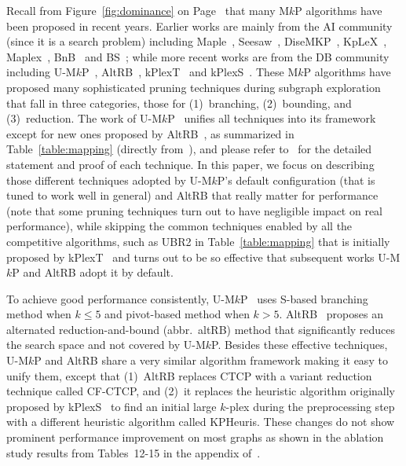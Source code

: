 \documentclass[sigconf,anonymous,review]{acmart}
\begin{document}
\vspace{1mm}
 Recall from Figure~\ref{fig:dominance} on Page~\pageref{fig:dominance} that many M$k$P algorithms have been proposed in recent years. Earlier works are mainly from the AI community (since it is a search problem) including Maple~\cite{Maple}, Seesaw~\cite{seesaw}, DiseMKP~\cite{DiseMKP}, KpLeX~\cite{KpLeX-MKP}, Maplex~\cite{Maplex}, BnB~\cite{BnB} and BS~\cite{BS}; while more recent works are from the DB community including U-M$k$P~\cite{akhlaque_vldb}, AltRB~\cite{clong_vldb}, kPlexT~\cite{kPlexT} and kPlexS~\cite{kPlexS}. 
%
These M$k$P algorithms have proposed many sophisticated pruning techniques during subgraph exploration that fall in three categories, those for (1)~branching, (2)~bounding, and (3)~reduction. The work of U-M$k$P~\cite{akhlaque_vldb} unifies all techniques into its framework except for new ones proposed by AltRB~\cite{clong_vldb}, as summarized in Table~\ref{table:mapping} (directly from~\cite{akhlaque_vldb}), and please refer to~\cite{akhlaque_vldb} for the detailed statement and proof of each technique. In this paper, we focus on describing those different techniques adopted by U-M$k$P's default configuration (that is tuned to work well in general) and AltRB that really matter for performance (note that some pruning techniques turn out to have negligible impact on real performance), while skipping the common techniques enabled by all the competitive algorithms, such as UBR2 in Table~\ref{table:mapping} that is initially proposed by kPlexT~\cite{kPlexT} and turns out to be so effective that subsequent works U-M$k$P and AltRB adopt it by default.

To achieve good performance consistently, U-M$k$P~\cite{akhlaque_vldb} uses S-based branching method when $k\leq 5$ and pivot-based method when $k>5$. AltRB~\cite{clong_vldb} proposes an alternated reduction-and-bound (abbr.\ altRB) method that significantly reduces the search space and not covered by U-M$k$P. Besides these effective techniques, U-M$k$P and AltRB share a very similar algorithm framework making it easy to unify them, except that (1)~AltRB replaces CTCP with a variant reduction technique called CF-CTCP, and (2)~it replaces the heuristic algorithm originally proposed by kPlexS~\cite{kPlexS} to find an initial large $k$-plex during the preprocessing step with a different heuristic algorithm called KPHeuris. These changes do not show prominent performance improvement on most graphs as shown in the ablation study results from Tables~12-15 in the appendix of~\cite{clong_vldb}.
\end{document}
